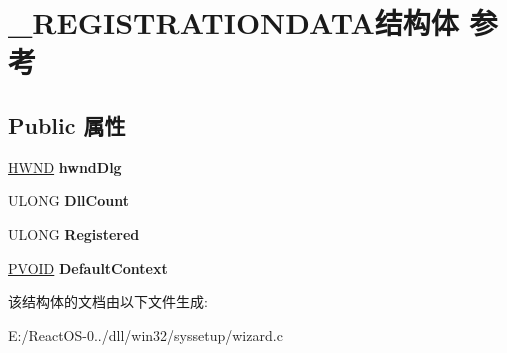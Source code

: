 \hypertarget{struct___r_e_g_i_s_t_r_a_t_i_o_n_d_a_t_a}{}\section{\+\_\+\+R\+E\+G\+I\+S\+T\+R\+A\+T\+I\+O\+N\+D\+A\+T\+A结构体 参考}
\label{struct___r_e_g_i_s_t_r_a_t_i_o_n_d_a_t_a}
\subsection*{Public 属性}
\begin{DoxyCompactItemize}
\item 
\mbox{\label{struct___r_e_g_i_s_t_r_a_t_i_o_n_d_a_t_a_aaa0c342a601488f76dcdcc4759545afe}} 
\hyperlink{interfacevoid}{H\+W\+ND} {\bfseries hwnd\+Dlg}
\item 
\mbox{\label{struct___r_e_g_i_s_t_r_a_t_i_o_n_d_a_t_a_afe3c9fd21505f65ad5f62d09fc26592e}} 
U\+L\+O\+NG {\bfseries Dll\+Count}
\item 
\mbox{\label{struct___r_e_g_i_s_t_r_a_t_i_o_n_d_a_t_a_aef7dadf1ee069cecdf23447464547208}} 
U\+L\+O\+NG {\bfseries Registered}
\item 
\mbox{\label{struct___r_e_g_i_s_t_r_a_t_i_o_n_d_a_t_a_a03bda75f9a8486c98dead08db8177482}} 
\hyperlink{interfacevoid}{P\+V\+O\+ID} {\bfseries Default\+Context}
\end{DoxyCompactItemize}


该结构体的文档由以下文件生成\+:\begin{DoxyCompactItemize}
\item 
E\+:/\+React\+O\+S-\/0../dll/win32/syssetup/wizard.\+c\end{DoxyCompactItemize}

